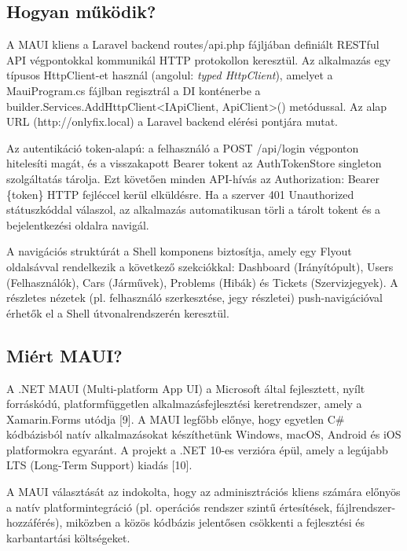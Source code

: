 \subsection{Hogyan működik?}\label{hogyan-mux171kuxf6dik-1}

A MAUI kliens a Laravel backend routes/api.php fájljában definiált RESTful API végpontokkal kommunikál HTTP protokollon keresztül. Az alkalmazás egy típusos HttpClient-et használ (angolul: \emph{typed HttpClient}), amelyet a MauiProgram.cs fájlban regisztrál a DI konténerbe a builder.Services.AddHttpClient\textless IApiClient, ApiClient\textgreater() metódussal. Az alap URL (http://onlyfix.local) a Laravel backend elérési pontjára mutat.

Az autentikáció token-alapú: a felhasználó a POST /api/login végponton hitelesíti magát, és a visszakapott Bearer tokent az AuthTokenStore singleton szolgáltatás tárolja. Ezt követően minden API-hívás az Authorization: Bearer \{token\} HTTP fejléccel kerül elküldésre. Ha a szerver 401 Unauthorized státuszkóddal válaszol, az alkalmazás automatikusan törli a tárolt tokent és a bejelentkezési oldalra navigál.

A navigációs struktúrát a Shell komponens biztosítja, amely egy Flyout oldalsávval rendelkezik a következő szekciókkal: Dashboard (Irányítópult), Users (Felhasználók), Cars (Járművek), Problems (Hibák) és Tickets (Szervizjegyek). A részletes nézetek (pl. felhasználó szerkesztése, jegy részletei) push-navigációval érhetők el a Shell útvonalrendszerén keresztül.

\subsection{Miért MAUI?}\label{miuxe9rt-maui}

A .NET MAUI (Multi-platform App UI) a Microsoft által fejlesztett, nyílt forráskódú, platformfüggetlen alkalmazásfejlesztési keretrendszer, amely a Xamarin.Forms utódja {[}9{]}. A MAUI legfőbb előnye, hogy egyetlen C\# kódbázisból natív alkalmazásokat készíthetünk Windows, macOS, Android és iOS platformokra egyaránt. A projekt a .NET 10-es verzióra épül, amely a legújabb LTS (Long-Term Support) kiadás {[}10{]}.

A MAUI választását az indokolta, hogy az adminisztrációs kliens számára előnyös a natív platformintegráció (pl. operációs rendszer szintű értesítések, fájlrendszer-hozzáférés), miközben a közös kódbázis jelentősen csökkenti a fejlesztési és karbantartási költségeket.

